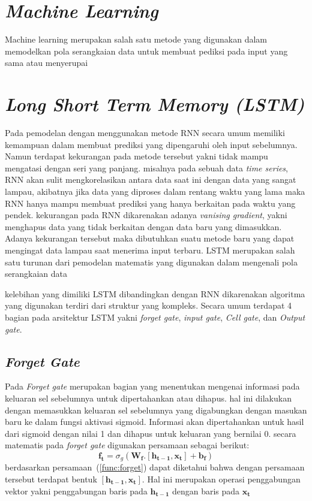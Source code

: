 \section{\textit{Machine Learning}}
Machine learning merupakan salah satu metode yang digunakan dalam memodelkan pola serangkaian data untuk membuat pediksi pada input yang sama atau menyerupai 
\section{\textit{Long Short Term Memory (LSTM)}}
Pada pemodelan dengan menggunakan metode RNN secara umum memiliki kemampuan dalam membuat prediksi yang dipengaruhi oleh input sebelumnya. Namun terdapat kekurangan pada metode tersebut yakni tidak mampu mengatasi dengan  seri yang panjang. misalnya pada sebuah data \textit{time series}, RNN akan sulit mengkorelasikan antara data saat ini dengan data yang sangat lampau, akibatnya jika data yang diproses dalam rentang waktu yang lama maka RNN hanya mampu membuat prediksi yang hanya berkaitan pada waktu yang pendek. kekurangan pada RNN dikarenakan adanya \textit{vanising gradient}, yakni menghapus data yang tidak berkaitan dengan data baru yang dimasukkan. Adanya kekurangan tersebut maka dibutuhkan suatu metode baru yang dapat mengingat data lampau saat menerima input terbaru. 
LSTM merupakan salah satu turunan dari pemodelan matematis yang digunakan dalam mengenali pola serangkaian data 

kelebihan yang dimiliki LSTM dibandingkan dengan RNN dikarenakan algoritma yang digunakan terdiri dari struktur yang kompleks. Secara umum terdapat 4 bagian pada arsitektur LSTM yakni \textit{forget gate}, \textit{input gate}, \textit{Cell gate}, dan \textit{Output gate}. 
\subsection{\textit{Forget Gate}}
Pada \textit{Forget gate} merupakan bagian yang menentukan mengenai informasi pada keluaran sel sebelumnya untuk dipertahankan atau dihapus. hal ini dilakukan dengan memasukkan keluaran sel sebelumnya yang digabungkan dengan masukan baru ke dalam fungsi aktivasi sigmoid. Informasi akan dipertahankan untuk hasil dari sigmoid dengan nilai 1 dan dihapus untuk keluaran yang bernilai 0. secara matematis pada \textit{forget gate} digunakan persamaan sebagai berikut:
\begin{equation}
	\boldsymbol{f_t} = \sigma_g(\boldsymbol{W_{f}}.[\boldsymbol{h_{t-1}}, \boldsymbol{x_t}] + \boldsymbol{b_f})
	\label{func:forget}
\end{equation} 
berdasarkan persamaan~(\ref{func:forget}) dapat diketahui bahwa dengan persamaan tersebut terdapat bentuk $[\boldsymbol{h_{t-1}}, \boldsymbol{x_t}]$. Hal ini merupakan operasi penggabungan vektor yakni penggabungan baris pada $\boldsymbol{h_{t-1}}$ dengan baris pada $\boldsymbol{x_t}$
